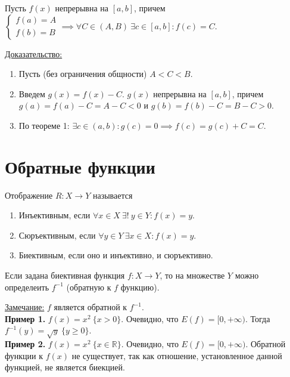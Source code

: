 \documentclass{article}
\begin{document}
\begin{theorem}
    Пусть \(f(x)\) непрерывна на \({[a, b]}\), причем \(
    \begin{cases}
        f(a) = A\\
        f(b) = B
    \end{cases} \implies \forall C \in (A, B)\ \exists c \in {[a, b]}: f(c) = C\).   
\end{theorem}
\noindent
\underline{Доказательство:}
\begin{enumerate}
    \item Пусть (без ограничения общности) \(A < C < B\).
    \item Введем \(g(x) = f(x) - C\). \(g(x)\) непрерывна на \({[a, b]}\), причем \(g(a) = f(a) - C = A - C < 0\) и \(g(b) = f(b) - C = B - C > 0\). 
    \item По теореме 1: \(\exists c \in (a, b): g(c) = 0 \implies f(c) = g(c) + C = C\).       
\end{enumerate}

\section{Обратные функции}

\begin{definition}
    Отображение \(R: X \to Y\) называется 
    \begin{enumerate}
        \item Инъективным, если \(\forall x \in X\ \exists!\ y \in Y: f(x) = y\).
        \item Сюръективным, если \(\forall y \in Y\ \exists x \in X: f(x) = y\). 
        \item Биективным, если оно и инъективно, и сюръективно.
    \end{enumerate}
\end{definition}

\begin{definition}
    Если задана биективная функция \(f: X \to Y\), то на множестве \(Y\) можно определеить \(f^{-1}\) (обратную к \(f\) функцию).
\end{definition}
\noindent
\underline{Замечание:} \(f\) является обратной к \(f^{-1}\).\\[0.15cm]
\textbf{Пример 1.} \(f(x) = x^2\ \{x > 0\}\). Очевидно, что \(E(f) = {[0, +\infty)}\). Тогда \(f^{-1}(y) = \sqrt{y}\ \{y \geq 0\}\).\\[0.15cm]
\textbf{Пример 2.} \(f(x) = x^2\ \{x \in \mathbb{R}\}\). Очевидно, что \(E(f) = {[0, +\infty)}\). Обратной функции к \(f(x)\) не существует, так как отношение, установленное данной функцией, не является биекцией.
\end{document}

